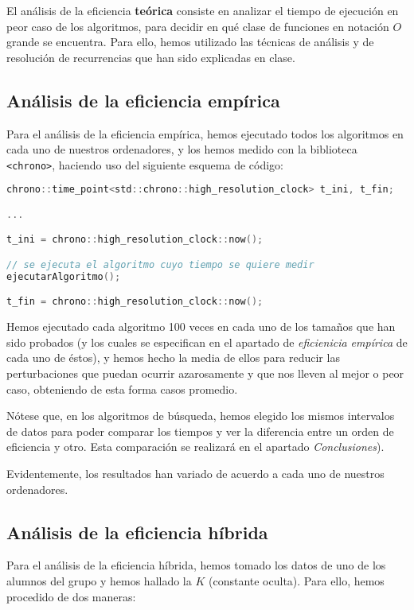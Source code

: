 \documentclass[10pt, a4paper]{article}
\theoremstyle{theorem-style}
\theoremstyle{theorem-style}
\theoremstyle{definition-style}
\theoremstyle{remark-style}
\theoremstyle{example-style}
\theoremstyle{definition-style}
\theoremstyle{remark-style}
\begin{document}
El análisis de la eficiencia \textbf{teórica} consiste en analizar el tiempo de ejecución en peor caso de los algoritmos, para decidir en qué clase de funciones en notación $O$ grande se encuentra. Para ello, hemos utilizado las técnicas de análisis y de resolución de recurrencias que han sido explicadas en clase.

\subsection*{Análisis de la eficiencia empírica}

Para el análisis de la eficiencia empírica, hemos ejecutado todos los algoritmos en cada uno de nuestros ordenadores, y los hemos medido con la biblioteca \texttt{<chrono>}, haciendo uso del siguiente esquema de código:

\begin{lstlisting}[language=C]
chrono::time_point<std::chrono::high_resolution_clock> t_ini, t_fin;

...

t_ini = chrono::high_resolution_clock::now();

// se ejecuta el algoritmo cuyo tiempo se quiere medir
ejecutarAlgoritmo();

t_fin = chrono::high_resolution_clock::now();
\end{lstlisting}

Hemos ejecutado cada algoritmo 100 veces en cada uno de los tamaños que han sido probados (y los cuales se especifican en el apartado de \emph{eficienicia empírica} de cada uno de éstos), y hemos hecho la media de ellos para reducir las perturbaciones que puedan ocurrir azarosamente y que nos lleven al mejor o peor caso, obteniendo de esta forma casos promedio.

Nótese que, en los algoritmos de búsqueda, hemos elegido los mismos intervalos de datos para poder comparar los tiempos y ver la diferencia entre un orden de eficiencia y otro. Esta comparación se realizará en el apartado \emph{Conclusiones}).

Evidentemente, los resultados han variado de acuerdo a cada uno de nuestros ordenadores.

\subsection*{Análisis de la eficiencia híbrida}

Para el análisis de la eficiencia híbrida, hemos tomado los datos de uno de los alumnos del grupo y hemos hallado la $K$ (constante oculta). Para ello, hemos procedido de dos maneras:
\end{document}
